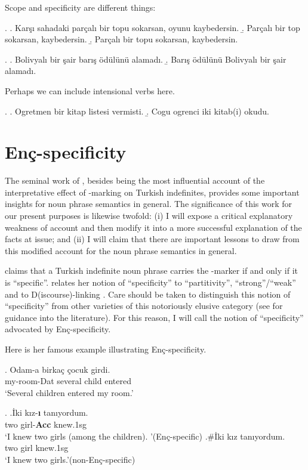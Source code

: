 \documentclass[11pt,a4paper]{article}
\newcommand{\encspec}{Enç-specific}
\begin{document}
Scope and specificity are different things:

\ex.
\a. Karşı sahadaki parçalı bir topu sokarsan, oyunu kaybedersin.
\b. Parçalı bir top sokarsan, kaybedersin.
\b. Parçalı bir topu sokarsan, kaybedersin.


\ex.
\a. Bolivyalı bir şair barış ödülünü alamadı.
\b. Barış ödülünü Bolivyalı bir şair alamadı. 


Perhaps we can include intensional verbs here.

\ex.
\a. Ogretmen bir kitap listesi vermisti.
\b. Cogu ogrenci iki kitab(i) okudu.


\section{\encspec{ity}} %
\label{scpartspec}

The seminal work of , besides being the most influential
account of the interpretative effect of \acc-marking on Turkish
indefinites, provides some important insights for noun phrase
semantics in general. The significance of this work for our present
purposes is likewise twofold: (i) I will expose a critical explanatory
weakness of  account and then modify it into a more
successful explanation of the facts at issue; and (ii) I will claim
that there are important lessons to draw from this modified account
for the noun phrase semantics in general.

 claims that a Turkish indefinite noun phrase carries the
\acc-marker if and only if it is ``specific''.   relates
her notion of ``specificity'' to ``partitivity'', ``strong''/``weak''
 and to D(iscourse)-linking . Care
should be taken to distinguish this notion of ``specificity'' from
other varieties of this notoriously elusive category (see
 for guidance into the literature). For this
reason, I will call the notion of ``specificity'' advocated by
 \encspec{ity}.

Here is her famous example illustrating \encspec{ity}.

\exg.\label{exencintro}%
{Odam-a}  {birka\c{c}} {\c{c}ocuk} {girdi.}\\
{my-room-Dat} {several}  {child}  {entered}\\
`Several children entered my room.'

\ex.\label{exenc}
\ag.\label{exenca}İki  kız-\textbf{ı} tanıyordum.\\
{two}  {girl-{\bf Acc}}  {knew.1sg}\\
`I knew two girls (among the children). '\hfill (\encspec)
\bg.\label{exencz}\#İki  kız  tanıyordum. \\
{two}  {girl}  {knew.1sg}\\
`I knew two girls.'\hfill (non-\encspec)
\end{document}
